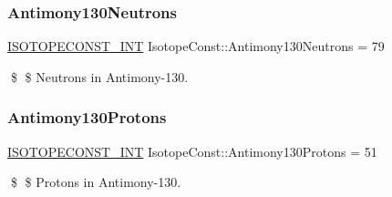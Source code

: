 \subsubsection{\texorpdfstring{Antimony130\+Neutrons}{Antimony130Neutrons}}
{\footnotesize\ttfamily \mbox{\hyperlink{group___isotope_const-_macros_ga5f18360b3e99483a35c32d789e62621c}{I\+S\+O\+T\+O\+P\+E\+C\+O\+N\+S\+T\+\_\+\+I\+NT}} Isotope\+Const\+::\+Antimony130\+Neutrons = 79}

\$ \$ Neutrons in Antimony-\/130. \mbox{\label{group___isotope_const-_antimony-_sb130_gab5c5b26361a249d2a4e0352576d18516}} 
\subsubsection{\texorpdfstring{Antimony130\+Protons}{Antimony130Protons}}
{\footnotesize\ttfamily \mbox{\hyperlink{group___isotope_const-_macros_ga5f18360b3e99483a35c32d789e62621c}{I\+S\+O\+T\+O\+P\+E\+C\+O\+N\+S\+T\+\_\+\+I\+NT}} Isotope\+Const\+::\+Antimony130\+Protons = 51}

\$ \$ Protons in Antimony-\/130. 